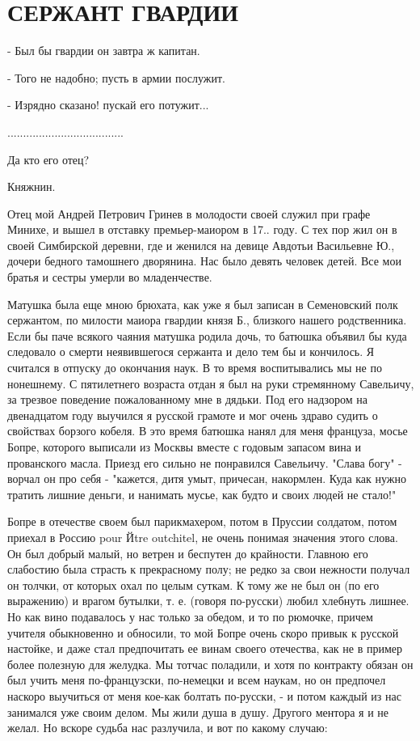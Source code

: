 \chapter{СЕРЖАНТ ГВАРДИИ}

- Был бы гвардии он завтра ж капитан.

- Того не надобно; пусть в армии послужит.

- Изрядно сказано! пускай его потужит...

.....................................

Да кто его отец?

Княжнин.


Отец мой  Андрей  Петрович  Гринев в  молодости своей служил  при графе
Минихе,  и вышел в отставку  премьер-маиором в 17.. году. С тех пор жил он в
своей  Симбирской  деревни, где и  женился на девице  Авдотьи Васильевне Ю.,
дочери бедного тамошнего дворянина. Нас  было  девять человек детей. Все мои
братья и сестры умерли во младенчестве.

Матушка была еще мною брюхата, как уже я был записан в Семеновский полк
сержантом, по милости маиора гвардии князя Б., близкого нашего родственника.
Если бы паче всякого чаяния  матушка родила дочь, то батюшка объявил бы куда
следовало  о  смерти  неявившегося сержанта  и  дело тем  бы и кончилось.  Я
считался в  отпуску  до окончания наук. В  то время воспитывались  мы не  по
нонешнему. С пятилетнего возраста отдан я был на руки стремянному Савельичу,
за трезвое  поведение  пожалованному  мне  в  дядьки.  Под его  надзором  на
двенадцатом году выучился я русской  грамоте  и  мог  очень здраво судить  о
свойствах борзого кобеля. В это время батюшка нанял для меня француза, мосье
Бопре,  которого  выписали  из  Москвы  вместе  с  годовым  запасом  вина  и
прованского масла. Приезд его сильно не понравился Савельичу. "Слава богу" -
ворчал он про  себя  -  "кажется, дитя умыт,  причесан,  накормлен. Куда как
нужно тратить лишние деньги,  и нанимать  мусье, как будто и  своих людей не
стало!"

Бопре в отечестве  своем  был парикмахером,  потом  в Пруссии солдатом,
потом приехал в Россию  pour Йtre outchitel, не очень понимая значения этого
слова. Он был добрый малый, но ветрен и беспутен до  крайности. Главною  его
слабостию была страсть к прекрасному полу; не редко за свои нежности получал
он толчки,  от которых охал  по целым суткам. К  тому же не был он  (по  его
выражению) и врагом бутылки, т. е. (говоря по-русски) любил хлебнуть лишнее.
Но  как  вино  подавалось у нас только за  обедом,  и то  по рюмочке, причем
учителя  обыкновенно и  обносили, то мой  Бопре очень скоро привык к русской
настойке, и  даже  стал предпочитать ее  винам своего  отечества,  как  не в
пример  более полезную для желудка.  Мы тотчас поладили, и хотя по контракту
обязан он был  учить  меня  по-французски, по-немецки и  всем наукам,  но он
предпочел наскоро выучиться от меня  кое-как  болтать  по-русски, -  и потом
каждый  из нас  занимался  уже своим делом.  Мы жили  душа  в  душу. Другого
ментора я  и  не  желал. Но вскоре судьба нас разлучила,  и  вот  по  какому
случаю:

